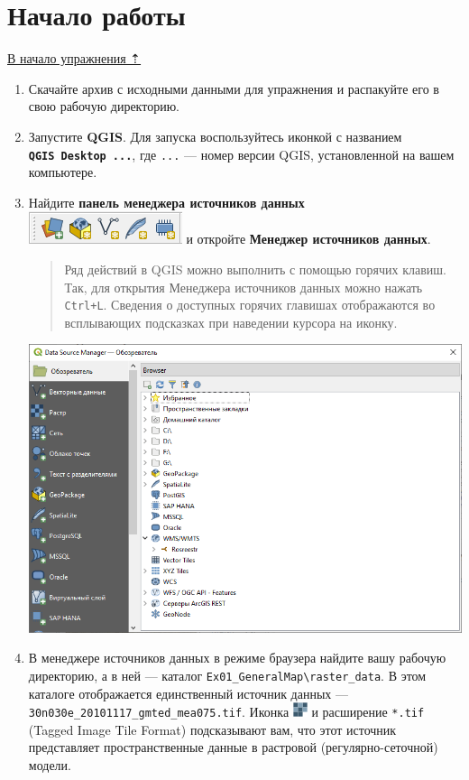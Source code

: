 \documentclass[
  12pt,
]{book}
\begin{document}
\hypertarget{map-design-general-begin}{%
\section{Начало работы}\label{map-design-general-begin}}

\protect\hyperlink{map-design-general}{В начало упражнения ⇡}

\begin{enumerate}
\def\labelenumi{\arabic{enumi}.}
\item
  Скачайте архив с исходными данными для упражнения и распакуйте его в свою рабочую директорию.
\item
  Запустите \textbf{QGIS}. Для запуска воспользуйтесь иконкой с названием \textbf{\texttt{QGIS\ Desktop\ ...}}, где \texttt{...} --- номер версии QGIS, установленной на вашем компьютере.
\item
  Найдите \textbf{панель менеджера источников данных} \includegraphics{images/Ex01/DataSourceManagerPanel.png} и откройте \textbf{Менеджер источников данных}.

  \begin{quote}
  Ряд действий в QGIS можно выполнить с помощью горячих клавиш. Так, для открытия Менеджера источников данных можно нажать \texttt{Ctrl+L}. Сведения о доступных горячих главишах отображаются во всплывающих подсказках при наведении курсора на иконку.
  \end{quote}

  \includegraphics{images/Ex01/DataSourceManager.png}
\item
  В менеджере источников данных в режиме браузера найдите вашу рабочую директорию, а в ней --- каталог \texttt{Ex01\_GeneralMap\textbackslash{}raster\_data}. В этом каталоге отображается единственный источник данных --- \texttt{30n030e\_20101117\_gmted\_mea075.tif}. Иконка \includegraphics{images/Ex01/raster.png} и расширение \texttt{*.tif} (Tagged Image Tile Format) подсказывают вам, что этот источник представляет пространственные данные в растровой (регулярно-сеточной) модели.


\end{enumerate}
\end{document}
